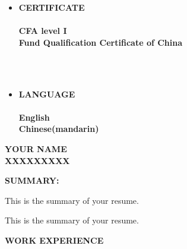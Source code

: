 \documentclass{ctexart}
\theoremstyle{plain}
\begin{document}
\begin{paracol}{2}
\begin{itemize}
		\\\hspace*{\fill}\\
		
		
		\item{\MakeUppercase{\LARGE\textbf{certificate}} %
		\\\hspace*{\fill}\\
		\normalsize\textbf{CFA level I\\Fund Qualification Certificate of China}}
		
		
		\\\hspace*{\fill}\\	
		
		\item{\MakeUppercase{\LARGE\textbf{language}} %
		\\\hspace*{\fill}\\
		\normalsize\textbf{English\\Chinese(mandarin)}}
	\end{itemize}
	
	\switchcolumn %
	
	
	\smash{\rule[-1\textheight]{2pt}{1\textheight}}
		
	\begin{center}
	
	\MakeUppercase{\Huge\textbf{your name}}\\
	\MakeUppercase{\normalsize\textbf{xxxxxxxxx}}
	\end{center}
	\begin{flushleft}
	
	\hspace*{.05\linewidth}
	{
	\MakeUppercase{\normalsize\textbf{summary: }}}
	
	\hspace*{.05\linewidth}
	{
	{This is the summary of your resume.}
	}
	
	\hspace*{.05\linewidth}
	{
	{This is the summary of your resume.}
	}
	
	\end{flushleft}
	
	\begin{flushleft}
	\hspace*{.05\linewidth} %
	\MakeUppercase{\Large\textbf{Work Experience}} %
	\end{flushleft}
		

\end{paracol}
\end{document}
